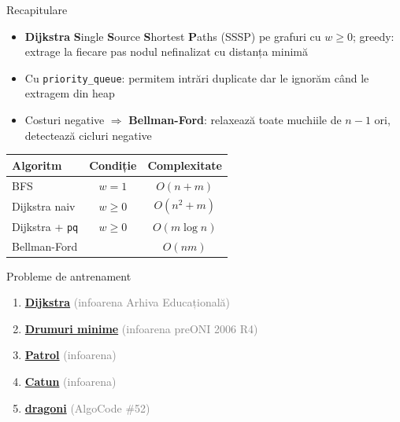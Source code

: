 \documentclass[10pt]{beamer}
\begin{document}
\begin{frame}{Recapitulare}
  \begin{itemize}
    \item \textbf{Dijkstra} \textemdash{} \textbf{S}ingle \textbf{S}ource \textbf{S}hortest \textbf{P}aths (SSSP) pe grafuri cu $w \geq 0$;
          greedy: extrage la fiecare pas nodul nefinalizat cu distanța minimă
    \item Cu \texttt{priority\_queue}: permitem intrări duplicate dar le ignorăm când le extragem din heap
    \item Costuri negative $\Rightarrow$ \textbf{Bellman-Ford}: relaxează toate muchiile de $n-1$ ori,
          detectează cicluri negative
  \end{itemize}

  \smallskip
  \begin{center}
  \begin{tabular*}{0.7\linewidth}{@{\extracolsep{\fill}}lcc}
    \toprule
    Algoritm & Condiție & Complexitate \\
    \midrule
    BFS                    & $w = 1$    & $O(n + m)$    \\
    Dijkstra naiv          & $w \geq 0$ & $O(n^2 + m)$  \\
    Dijkstra + \texttt{pq} & $w \geq 0$ & $O(m \log n)$ \\
    Bellman-Ford           & \textemdash{}  & $O(nm)$       \\
    \bottomrule
  \end{tabular*}
  \end{center}
\end{frame}

\begin{frame}{Probleme de antrenament}
  \begin{enumerate}
    \item \href{https://infoarena.ro/problema/dijkstra}{\textbf{Dijkstra}}
          \textcolor{gray}{(infoarena \textemdash{} Arhiva Educațională)}
    \item \href{https://infoarena.ro/problema/dmin}{\textbf{Drumuri minime}}
          \textcolor{gray}{(infoarena \textemdash{} preONI 2006 R4)}
    \item \href{https://infoarena.ro/problema/patrol}{\textbf{Patrol}}
          \textcolor{gray}{(infoarena)}
    \item \href{https://infoarena.ro/problema/catun}{\textbf{Catun}}
          \textcolor{gray}{(infoarena)}
    \item \href{https://code.algolymp.com/problems/52}{\textbf{dragoni}}
          \textcolor{gray}{(AlgoCode \#52)}
  \end{enumerate}
\end{frame}
\end{document}

